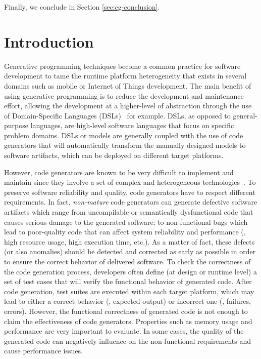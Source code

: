 Finally, we conclude in Section \ref{sec:cg-conclusion}. 

\iffalse
\section{Introduction}
\label{sec:cg_introduction}

Generative programming techniques become a common practice for software development to tame the runtime platform heterogeneity that exists in several domains such as mobile or Internet of Things development. 
The main benefit of using generative programming is to reduce the development and maintenance effort, allowing the development at a higher-level of abstraction through the use of Domain-Specific Languages (DSLs)~\cite{brambilla2012model} for example. 
DSLs, as opposed to general-purpose languages, are high-level software languages that focus on specific problem domains. 
DSLs or models are generally coupled with the use of code generators that will automatically transform the manually designed models to software artifacts, which can be deployed on different target platforms. 

However, code generators are known to be very difficult to implement and maintain since they involve a set of complex and heterogeneous technologies~\cite{france2007model,guana2015developers}.
To preserve software reliability and quality, code generators have to respect different requirements. In fact, \textit{non-mature} code generators can generate defective software artifacts which range from uncompilable or semantically dysfunctional code that causes serious damage to the generated software; to non-functional bugs which lead to poor-quality code that can affect system reliability and performance (\eg, high resource usage, high execution time, etc.). 
As a matter of fact, these defects (or also anomalies) should be detected and corrected as early as possible in order to ensure the correct behavior of delivered software.
To check the correctness of the code generation process, developers often define (at design or runtime level) a set of test cases that will verify the functional behavior of generated code. 
After code generation, test suites are executed within each target platform, which may lead to either a correct behavior (\ie, expected output) or incorrect one (\ie, failures, errors).
However, the functional correctness of generated code is not enough to claim the effectiveness of code generators. Properties such as memory usage and performance are very important to evaluate. In some cases, the quality of the generated code can negatively influence on the non-functional requirements and cause performance issues\cite{hundt2011loop,ray2014large}.

